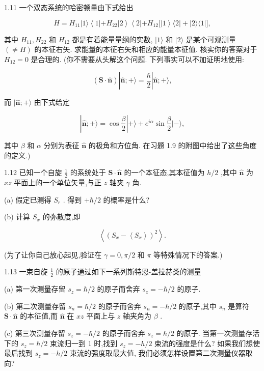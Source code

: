 \documentclass[lang=cn,newtx,10pt,scheme=chinese,thmcnt=section]{elegantbook}
\begin{document}
1.11 一个双态系统的哈密顿量由下式给出

$$
H = {H}_{11}\left| {1\rangle \left\langle {1\left| {+{H}_{22}}\right| 2}\right\rangle \left\langle {2\left| {+{H}_{12}\lbrack }\right| 1}\right\rangle \langle 2}\right| + \left| {2\rangle \langle 1}\right| \rbrack ,
$$

其中 ${H}_{11},{H}_{22}$ 和 ${H}_{12}$ 都是有着能量量纲的实数, $|1\rangle$ 和 $|2\rangle$ 是某个可观测量 $\left( { \neq H}\right)$ 的本征右矢. 求能量的本征右矢和相应的能量本征值. 核实你的答案对于 ${H}_{12} = 0$ 是合理的. (你不需要从头解这个问题. 下列事实可以不加证明地使用:

$$
\left( {\mathbf{S} \cdot \widehat{\mathbf{n}}}\right) \left| {\widehat{\mathbf{n}}; + \rangle = \frac{\hbar }{2}}\right| \widehat{\mathbf{n}}; + \rangle ,
$$

而 $\mid \widehat{\mathbf{n}}; + \rangle$ 由下式给定

$$
\left| {\widehat{\mathbf{n}}; + \rangle = \cos \frac{\beta }{2}}\right| + \rangle + {e}^{i\alpha }\sin \frac{\beta }{2}| - \rangle ,
$$

其中 $\beta$ 和 $\alpha$ 分别为表征 $\widehat{\mathbf{n}}$ 的极角和方位角. 在习题 1.9 的附图中给出了这些角度的定义.)

1.12 已知一个自旋 $\frac{1}{2}$ 的系统处于 $\mathbf{S} \cdot \widehat{\mathbf{n}}$ 的一个本征态,其本征值为 $h/2$ ,其中 $\widehat{\mathbf{n}}$ 为 ${xz}$ 平面上的一个单位矢量,与正 $z$ 轴夹 $\gamma$ 角.

(a) 假定已测得 ${S}_{r}$ . 得到 $+ \hbar /2$ 的概率是什么?

(b) 计算 ${S}_{x}$ 的弥散度,即

$$
\left\langle {\left( {S}_{x} - \left\langle {S}_{x}\right\rangle \right) }^{2}\right\rangle \text{.}
$$

(为了让你自己放心起见,验证在 $\gamma = 0,\pi /2$ 和 $\pi$ 等特殊情况下的答案.)

1.13 一束自旋 $\frac{1}{2}$ 的原子通过如下一系列斯特恩-盖拉赫类的测量

(a) 第一次测量存留 ${s}_{z} = \hbar /2$ 的原子而舍弃 ${s}_{z} = - \hbar /2$ 的原子.

(b) 第二次测量存留 ${s}_{n} = \hbar /2$ 的原子而舍弃 ${s}_{n} = - \hbar /2$ 的原子,其中 ${s}_{n}$ 是算符 $\mathbf{S} \cdot \widehat{\mathbf{n}}$ 的本征值,而 $\widehat{\mathbf{n}}$ 在 ${xz}$ 平面上与 $z$ 轴夹角为 $\beta$ .

(c) 第三次测量存留 ${s}_{z} = - \hbar /2$ 的原子而舍弃 ${s}_{z} = \hbar /2$ 的原子. 当第一次测量存活下的 ${s}_{z} = \hbar /2$ 束流归一到 1 时,找到 ${s}_{z} = - h/2$ 束流的强度是什么? 如果我们想使最后找到 ${s}_{z} = - h/2$ 束流的强度取最大值, 我们必须怎样设置第二次测量仪器取向?
\end{document}
